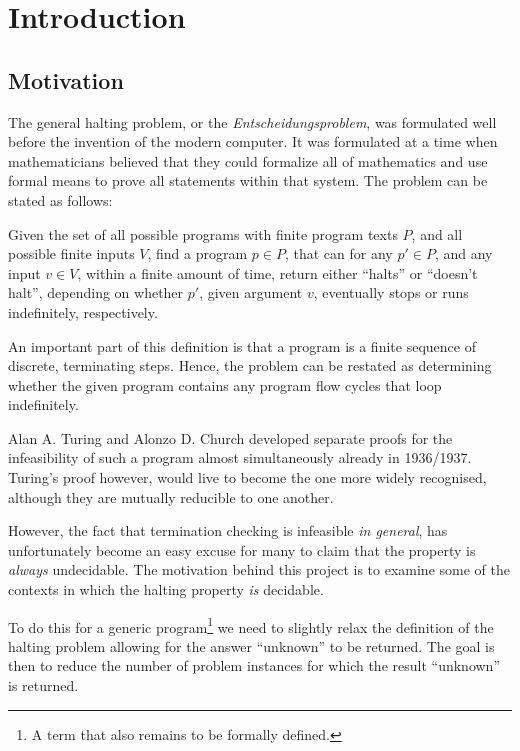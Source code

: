 \chapter{Introduction}\label{section:introduction}

\section{Motivation}

The general halting problem, or the \emph{Entscheidungsproblem}, was formulated
well before the invention of the modern computer. It was formulated at a time
when mathematicians believed that they could formalize all of mathematics and
use formal means to prove all statements within that system. The problem can be
stated as follows:

\begin{definition}\label{definition:halting-1} Given the set of all possible
programs with finite program texts $P$, and all possible finite inputs $V$,
find a program $p\in P$, that can for any $p'\in P$, and any input $v\in V$,
within a finite amount of time, return either ``halts'' or ``doesn't halt'',
depending on whether $p'$, given argument $v$, eventually stops or runs
indefinitely, respectively.\end{definition}
 
An important part of this definition is that a program is a finite sequence of
discrete, terminating steps. Hence, the problem can be restated as determining
whether the given program contains any program flow cycles that loop
indefinitely.

Alan A. Turing and Alonzo D. Church developed separate proofs for the
infeasibility of such a program almost simultaneously already in 1936/1937.
Turing's proof\cite{turing-machine} however, would live to become the one more
widely recognised, although they are mutually reducible to one another.

However, the fact that termination checking is infeasible \emph{in general},
has unfortunately become an easy excuse for many to claim that the property is
\emph{always} undecidable. The motivation behind this project is to examine
some of the contexts in which the halting property \emph{is} decidable.

To do this for a generic program\footnote{A term that also remains to be
formally defined.} we need to slightly relax the definition of the halting
problem allowing for the answer ``unknown'' to be returned. The goal is then to
reduce the number of problem instances for which the result ``unknown'' is
returned.

